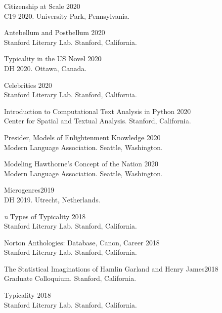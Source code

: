 \documentclass[
  12pt,
  letterpaper,
]{article}
\begin{document}
Citizenship at Scale \hfill 2020\\
\hspace*{0.333em} C19 2020. University Park, Pennsylvania.

Antebellum and Postbellum \hfill 2020\\
\hspace*{0.333em} Stanford Literary Lab. Stanford, California.

Typicality in the US Novel \hfill 2020\\
\hspace*{0.333em} DH 2020. Ottawa, Canada.

Celebrities \hfill 2020\\
\hspace*{0.333em} Stanford Literary Lab. Stanford, California.

Introduction to Computational Text Analysis in Python \hfill 2020\\
\hspace*{0.333em} Center for Spatial and Textual Analysis. Stanford,
California.

Presider, Models of Enlightenment Knowledge \hfill 2020\\
\hspace*{0.333em} Modern Language Association. Seattle, Washington.

Modeling Hawthorne's Concept of the Nation \hfill 2020\\
\hspace*{0.333em} Modern Language Association. Seattle, Washington.

Microgenres\hfill 2019\\
\hspace*{0.333em} DH 2019. Utrecht, Netherlands.

\emph{n} Types of Typicality \hfill 2018\\
\hspace*{0.333em} Stanford Literary Lab. Stanford, California.

Norton Anthologies: Database, Canon, Career \hfill 2018\\
\hspace*{0.333em} Stanford Literary Lab. Stanford, California.

The Statistical Imaginations of Hamlin Garland and Henry
James\hfill 2018\\
\hspace*{0.333em} Graduate Colloquium. Stanford, California.

Typicality \hfill 2018\\
\hspace*{0.333em} Stanford Literary Lab. Stanford, California.
\end{document}
